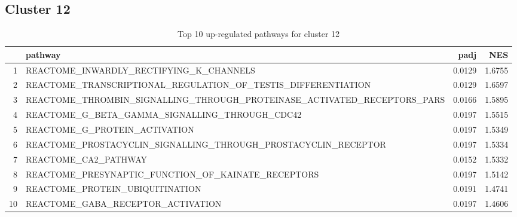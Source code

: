 \documentclass{article}
\begin{document}
\subsection{Cluster 12 }
\begin{table}[H]
\centering
\begin{tabularx}{\textwidth}{rlrr}
  \hline
 & pathway & padj & NES \\ 
  \hline
1 & REACTOME\_INWARDLY\_RECTIFYING\_K\_CHANNELS & 0.0129 & 1.6755 \\ 
  2 & REACTOME\_TRANSCRIPTIONAL\_REGULATION\_OF\_TESTIS\_DIFFERENTIATION & 0.0129 & 1.6597 \\ 
  3 & REACTOME\_THROMBIN\_SIGNALLING\_THROUGH\_PROTEINASE\_ACTIVATED\_RECEPTORS\_PARS & 0.0166 & 1.5895 \\ 
  4 & REACTOME\_G\_BETA\_GAMMA\_SIGNALLING\_THROUGH\_CDC42 & 0.0197 & 1.5515 \\ 
  5 & REACTOME\_G\_PROTEIN\_ACTIVATION & 0.0197 & 1.5349 \\ 
  6 & REACTOME\_PROSTACYCLIN\_SIGNALLING\_THROUGH\_PROSTACYCLIN\_RECEPTOR & 0.0197 & 1.5334 \\ 
  7 & REACTOME\_CA2\_PATHWAY & 0.0152 & 1.5332 \\ 
  8 & REACTOME\_PRESYNAPTIC\_FUNCTION\_OF\_KAINATE\_RECEPTORS & 0.0197 & 1.5142 \\ 
  9 & REACTOME\_PROTEIN\_UBIQUITINATION & 0.0191 & 1.4741 \\ 
  10 & REACTOME\_GABA\_RECEPTOR\_ACTIVATION & 0.0197 & 1.4606 \\ 
   \hline
\end{tabularx}
\caption{Top 10 up-regulated pathways for cluster 12} 
\label{tab:q3_2_12}
\end{table}
\end{document}
